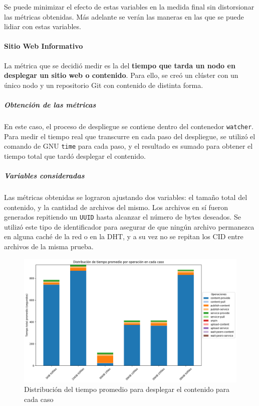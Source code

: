  Se puede minimizar  el efecto de estas variables en la medida final sin distorsionar las métricas obtenidas. Más adelante se verán las maneras en las que se puede lidiar con estas variables.

\paragraph{Sitio Web Informativo}
La métrica que se decidió medir es la del \textbf{tiempo que tarda un nodo en desplegar un sitio web o contenido}. Para ello, se creó un clúster con un único nodo y un repositorio Git con contenido de distinta forma.

\subparagraph{Obtención de las métricas} En este caso, el proceso de despliegue se contiene dentro del contenedor \texttt{watcher}. Para medir el tiempo real que transcurre en cada paso del despliegue, se utilizó el comando de GNU \texttt{time} para cada paso, y el resultado es sumado para obtener el tiempo total que tardó desplegar el contenido.

\subparagraph{Variables consideradas} Las métricas obtenidas se lograron ajustando dos variables: el tamaño total del contenido, y la cantidad de archivos del mismo. Los archivos en sí fueron generados repitiendo un \texttt{UUID} hasta alcanzar el número de bytes deseados. Se utilizó este tipo de identificador para asegurar de que ningún archivo permanezca en alguna caché de la red o en la DHT, y a su vez no se repitan los CID entre archivos de la misma prueba.

\begin{figure}[H]
    \centering
    \includegraphics[width=1\linewidth]{img/metricas-ipfs/metricas-ipfs-caso1-1.png}
    \caption{Distribución del tiempo promedio para desplegar el contenido para cada caso}
    \label{fig:metricas-ipfs-caso1-1.png}
\end{figure}


